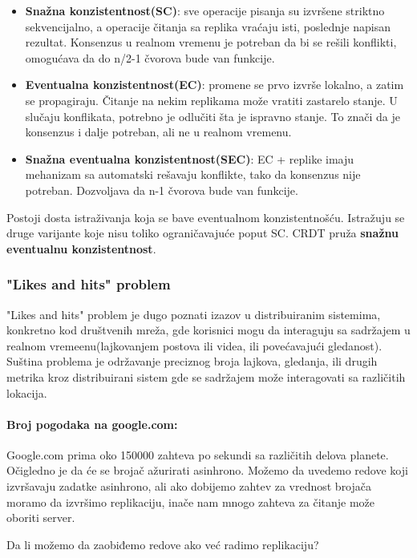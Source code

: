 \documentclass[12pt]{article}
\begin{document}
\begin{itemize}
	\item \textbf{Snažna konzistentnost(SC)}: sve operacije pisanja su izvršene striktno sekvencijalno, a operacije čitanja sa replika vraćaju isti, poslednje napisan rezultat. Konsenzus u realnom vremenu je potreban da bi se rešili konflikti, omogućava da do n/2-1 čvorova bude van funkcije.
	\item \textbf{Eventualna konzistentnost(EC)}: promene se prvo izvrše lokalno, a zatim se propagiraju. Čitanje na nekim replikama može vratiti zastarelo stanje. U slučaju konflikata, potrebno je odlučiti šta je ispravno stanje. To znači da je konsenzus i dalje potreban, ali ne u realnom vremenu.
	\item \textbf{Snažna eventualna konzistentnost(SEC)}: EC + replike imaju mehanizam sa automatski rešavaju konflikte, tako da konsenzus nije potreban. Dozvoljava da n-1 čvorova bude van funkcije.
\end{itemize}

Postoji dosta istraživanja koja se bave eventualnom konzistentnošću. Istražuju se druge varijante koje nisu toliko ograničavajuće poput SC. CRDT pruža \textbf{snažnu eventualnu konzistentnost}.

\subsubsection{"Likes and hits" problem}

"Likes and hits" problem je dugo poznati izazov u distribuiranim sistemima, konkretno kod društvenih mreža, gde korisnici mogu da interaguju sa sadržajem u realnom vremeenu(lajkovanjem postova ili videa, ili povećavajući gledanost). Suština problema je održavanje preciznog broja lajkova, gledanja, ili drugih metrika kroz distribuirani sistem gde se sadržajem može interagovati sa različitih lokacija.

\paragraph{Broj pogodaka na google.com:}

Google.com prima oko 150000 zahteva po sekundi sa različitih delova planete. Očigledno je da će se brojač ažurirati asinhrono. Možemo da uvedemo redove koji izvršavaju zadatke asinhrono, ali ako dobijemo zahtev za vrednost brojača moramo da izvršimo replikaciju, inače nam mnogo zahteva za čitanje može oboriti server.

Da li možemo da zaobiđemo redove ako već radimo replikaciju?
\end{document}
